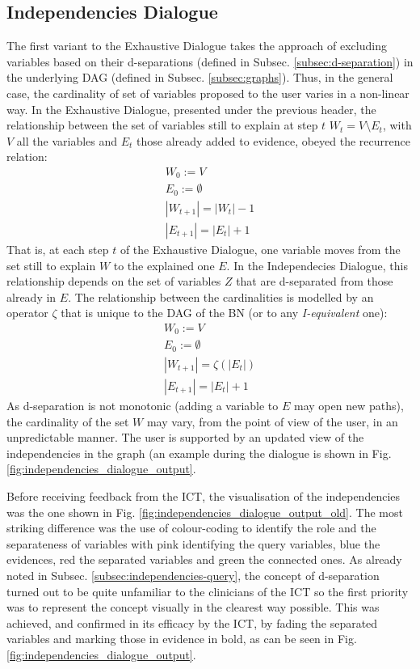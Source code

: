 \subsection{Independencies Dialogue}
The first variant to the Exhaustive Dialogue takes the approach of excluding variables based on their d-separations (defined in Subsec. \ref{subsec:d-separation}) in the underlying DAG (defined in Subsec. \ref{subsec:graphs}).
Thus, in the general case, the cardinality of set of variables proposed to the user varies in a non-linear way.
In the Exhaustive Dialogue, presented under the previous header, the relationship between the set of variables still to explain at step $t$ $W_t = V \setminus E_t$, with $V$ all the variables and $E_t$ those already added to evidence, obeyed the recurrence relation:
\begin{align}
	W_0 := V \\
	E_0 := \emptyset \\
	|W_{t+1}| = |W_t| - 1 \\
	|E_{t+1}| = |E_t| + 1
\end{align}
That is, at each step $t$ of the Exhaustive Dialogue, one variable moves from the set still to explain $W$ to the explained one $E$.
In the Independecies Dialogue, this relationship depends on the set of variables $Z$ that are d-separated from those already in $E$.
The relationship between the cardinalities is modelled by an operator $\zeta$ that is unique to the DAG of the BN (or to any \textit{I-equivalent} one):
\begin{align}
	W_0 := V \\
	E_0 := \emptyset \\
	|W_{t+1}| = \zeta(|E_t|) \\
	|E_{t+1}| = |E_t| + 1
\end{align}
As d-separation is not monotonic (adding a variable to $E$ may open new paths), the cardinality of the set $W$ may vary, from the point of view of the user, in an unpredictable manner.
The user is supported by an updated view of the independencies in the graph (an example during the dialogue is shown in Fig. \ref{fig:independencies_dialogue_output}.

Before receiving feedback from the ICT, the visualisation of the independencies was the one shown in Fig. \ref{fig:independencies_dialogue_output_old}.
The most striking difference was the use of colour-coding to identify the role and the separateness of variables with pink identifying the query variables, blue the evidences, red the separated variables and green the connected ones.
As already noted in Subsec. \ref{subsec:independencies-query}, the concept of d-separation turned out to be quite unfamiliar to the clinicians of the ICT so the first priority was to represent the concept visually in the clearest way possible.
This was achieved, and confirmed in its efficacy by the ICT, by fading the separated variables and marking those in evidence in bold, as can be seen in Fig. \ref{fig:independencies_dialogue_output}.

